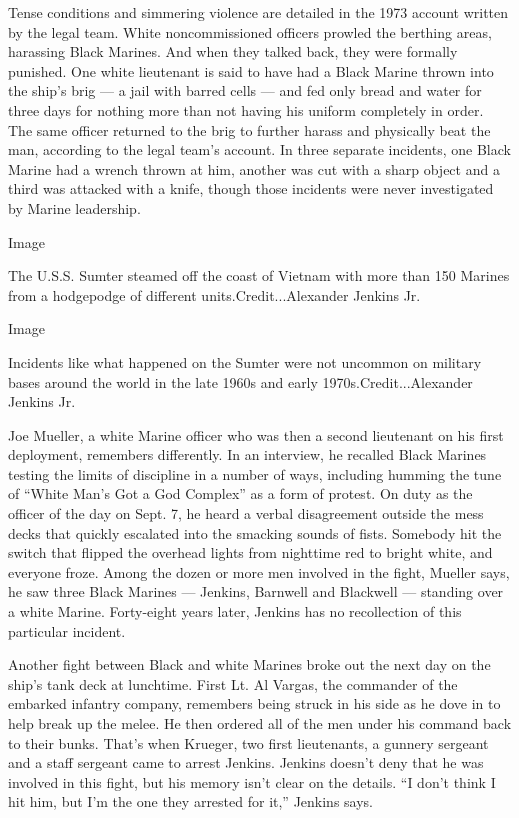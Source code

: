 Tense conditions and simmering violence are detailed in the 1973 account
written by the legal team. White noncommissioned officers prowled the
berthing areas, harassing Black Marines. And when they talked back, they
were formally punished. One white lieutenant is said to have had a Black
Marine thrown into the ship's brig --- a jail with barred cells --- and
fed only bread and water for three days for nothing more than not having
his uniform completely in order. The same officer returned to the brig
to further harass and physically beat the man, according to the legal
team's account. In three separate incidents, one Black Marine had a
wrench thrown at him, another was cut with a sharp object and a third
was attacked with a knife, though those incidents were never
investigated by Marine leadership.

Image

The U.S.S. Sumter steamed off the coast of Vietnam with more than 150
Marines from a hodgepodge of different units.Credit...Alexander Jenkins
Jr.

Image

Incidents like what happened on the Sumter were not uncommon on military
bases around the world in the late 1960s and early
1970s.Credit...Alexander Jenkins Jr.

Joe Mueller, a white Marine officer who was then a second lieutenant on
his first deployment, remembers differently. In an interview, he
recalled Black Marines testing the limits of discipline in a number of
ways, including humming the tune of ``White Man's Got a God Complex'' as
a form of protest. On duty as the officer of the day on Sept. 7, he
heard a verbal disagreement outside the mess decks that quickly
escalated into the smacking sounds of fists. Somebody hit the switch
that flipped the overhead lights from nighttime red to bright white, and
everyone froze. Among the dozen or more men involved in the fight,
Mueller says, he saw three Black Marines --- Jenkins, Barnwell and
Blackwell --- standing over a white Marine. Forty-eight years later,
Jenkins has no recollection of this particular incident.

Another fight between Black and white Marines broke out the next day on
the ship's tank deck at lunchtime. First Lt. Al Vargas, the commander of
the embarked infantry company, remembers being struck in his side as he
dove in to help break up the melee. He then ordered all of the men under
his command back to their bunks. That's when Krueger, two first
lieutenants, a gunnery sergeant and a staff sergeant came to arrest
Jenkins. Jenkins doesn't deny that he was involved in this fight, but
his memory isn't clear on the details. ``I don't think I hit him, but
I'm the one they arrested for it,'' Jenkins says.

